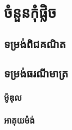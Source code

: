 \documentclass[a4paper,11pt]{booki}
\begin{document}
	\chapter{ចំនួនកុំផ្លិច}
	\section{ទម្រង់ពិជគណិត}
	\section{ទម្រង់ធរណីមាត្រ}
	\subsection{ម៉ូឌុល}
	\subsection{អាគុយម៉ង់}
\end{document}
